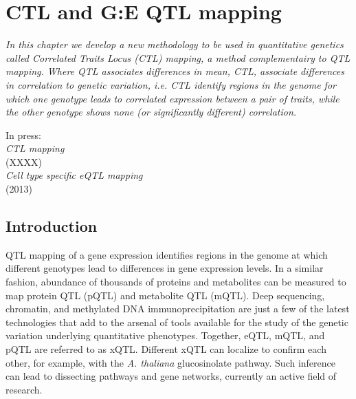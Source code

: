 \chapter{CTL and G:E QTL mapping}
\label{chap:ctlmapping}

\emph{In this chapter we develop a new methodology to be used in quantitative genetics 
called Correlated Traits Locus (CTL) mapping, a method complementairy to QTL mapping. 
Where QTL associates differences in mean, CTL, associate differences in correlation to 
genetic variation, i.e. CTL identify regions in the genome for which one genotype leads 
to correlated expression between a pair of traits, while the other genotype shows none 
(or significantly different) correlation.}

\null
\vfill

\begin{myexampleblock}{In press:}
  \\
  \emph{CTL mapping}\\
   (XXXX)
  \\
  \emph{Cell type specific eQTL mapping}\\
   (2013)
\end{myexampleblock}

\newpage

\section{Introduction}
  QTL mapping of a gene expression identifies regions in the genome at which different genotypes lead to differences in gene
  expression levels. In a similar fashion, abundance of thousands of proteins and metabolites can be measured to map protein 
  QTL (pQTL) and metabolite QTL (mQTL). 
  Deep sequencing, chromatin, and methylated DNA immunoprecipitation are just a few of the latest technologies that add to 
  the arsenal of tools available for the study of the genetic variation underlying quantitative phenotypes. Together, eQTL, 
  mQTL, and pQTL are referred to as xQTL\cite{Arends:2012}. Different xQTL can localize to confirm each other, for example, 
  with the \emph{A. thaliana} glucosinolate pathway\cite{Jansen:2009}. Such inference can lead to dissecting pathways and gene networks, 
  currently an active field of research\cite{Prins:2012}.
  
